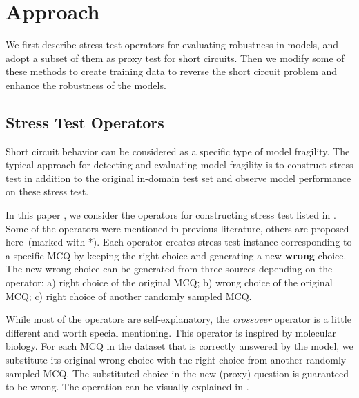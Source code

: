 \section{Approach}

We first describe stress test operators for evaluating robustness in
models, and adopt a subset of them as proxy test for short circuits. 
Then we modify some of these methods to create
training data to reverse the short circuit problem
and enhance the robustness of the models.
 \subsection{Stress Test Operators}
 \label{sec:stressop}
Short circuit behavior can be considered as a specific type of model fragility. The typical approach for detecting and evaluating model fragility is to construct stress test in addition to the original in-domain test set and observe model performance on these stress test.

In this paper , we consider the operators for constructing stress test listed in . Some of the operators were mentioned in previous literature, others are proposed here~(marked with *). Each operator creates stress test instance corresponding to a specific MCQ by keeping the right choice and generating a new \textbf{wrong} choice. The new wrong choice can be generated from 
three sources depending on the operator: a) right choice of the original MCQ; 
b) wrong choice of the original MCQ; c) right choice of another randomly 
sampled MCQ. 

While most of the operators are self-explanatory,
the \textit{crossover} operator is a little different and worth special mentioning.
This operator is inspired by molecular biology.
For each MCQ in the dataset that is correctly answered by the model, 
we substitute its original wrong choice with the right choice from 
another randomly sampled MCQ. The substituted choice in the new (proxy) 
question is guaranteed to be wrong. The operation can be visually
explained in . 

